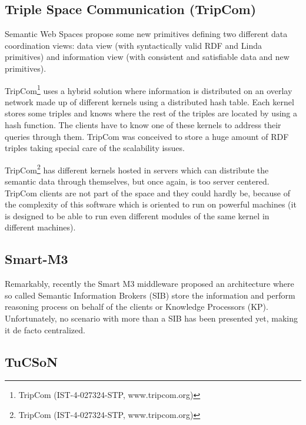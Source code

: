 \subsection{Triple Space Communication (TripCom)}
Semantic Web Spaces propose some new primitives defining
two different data coordination views: data view (with syntactically valid RDF and Linda primitives) and information view
(with consistent and satisfiable data and new primitives).




TripCom\footnote{TripCom (IST-4-027324-STP, www.tripcom.org)} uses a hybrid solution where information is distributed on
an overlay network made up of different kernels using a distributed hash table. Each kernel stores some triples and
knows where the rest of the triples are located by using a hash function. The clients have to know one of these
kernels to address their queries through them. TripCom was conceived to store a huge amount of RDF triples taking
special care of the scalability issues.


TripCom\footnote{TripCom (IST-4-027324-STP, www.tripcom.org)} has different kernels hosted in servers which can distribute the semantic data
through themselves, but once again, is too server centered. TripCom clients are not part of the space and they could hardly be, because of
the complexity of this software which is oriented to run on powerful machines (it is designed to be able to run even different modules of the
same kernel in different machines).


\subsection{Smart-M3}





Remarkably, recently the Smart M3 middleware proposed an
architecture where so called Semantic Information Brokers (SIB) store the information and perform reasoning
process on behalf of the clients or Knowledge Processors (KP). Unfortunately, no scenario with more than a SIB has been
presented yet, making it de facto centralized.


\subsection{TuCSoN}

